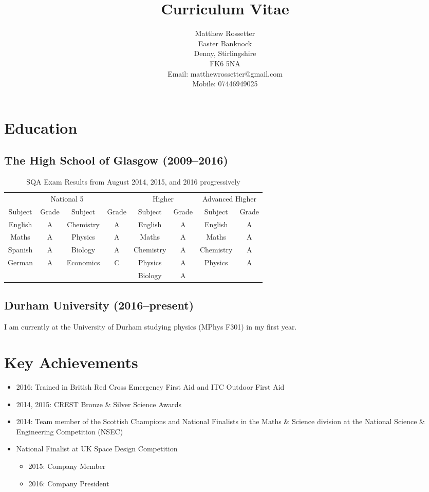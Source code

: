 \documentclass[10pt, a4paper]{article}
\title{\vspace{-2.2cm}Curriculum Vitae\vspace{-0.75cm}}
\author{Matthew Rossetter \\ Easter Banknock \\ Denny, Stirlingshire \\ FK6 5NA \\ Email: matthewrossetter@gmail.com \\ Mobile: 07446949025}
\date{\vspace{-1.5cm}}
\begin{document}
\maketitle
\thispagestyle{fancy}
\section{Education}
	\subsection{The High School of Glasgow (2009--2016)}
	\begin{table}[htbp]
		\centering
			\caption{SQA Exam Results from August 2014, 2015, and 2016 progressively}
	    	\begin{tabular}{|c|c|c|c|c|c|c|c|}
		    \multicolumn{4}{|c|}{National 5} & \multicolumn{2}{c|}{Higher} & \multicolumn{2}{c|}{Advanced Higher} \\
		    Subject & Grade & Subject & Grade & Subject & Grade & Subject & Grade \\
			\hline
		    English & A & Chemistry & A & English & A & English & A \\
		   	Maths & A & Physics & A & Maths & A & Maths & A \\
		    Spanish & A & Biology & A & Chemistry & A & Chemistry & A \\
		    German & A & Economics & C & Physics & A & Physics & A \\
		          &       &       &       & Biology & A     &       &  \\
			\end{tabular}%
	\end{table}%
	\subsection{Durham University (2016--present)}
	I am currently at the University of Durham studying physics (MPhys F301) in my first year.
\section{Key Achievements}
\begin{itemize}
	\item 2016: Trained in British Red Cross Emergency First Aid and ITC Outdoor First Aid
	\item 2014, 2015: CREST Bronze \& Silver Science Awards
	\item 2014: Team member of the Scottish Champions and National Finalists in the Maths \& Science division at the National Science \& Engineering Competition (NSEC)
	\item National Finalist at UK Space Design Competition
	\begin{itemize}
		\item 2015: Company Member
		\item 2016: Company President
	\end{itemize}
\end{itemize}
\end{document}
